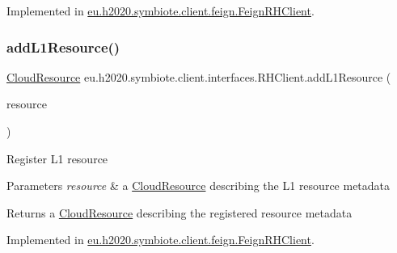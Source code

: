 Implemented in \hyperlink{classeu_1_1h2020_1_1symbiote_1_1client_1_1feign_1_1FeignRHClient_aa15dbd07f234fb7b16db50309af8cd12}{eu.\+h2020.\+symbiote.\+client.\+feign.\+Feign\+R\+H\+Client}.

\mbox{\label{interfaceeu_1_1h2020_1_1symbiote_1_1client_1_1interfaces_1_1RHClient_a7144c5a23f5e77e2fd10c2b79fcacf50}} 
\subsubsection{\texorpdfstring{add\+L1\+Resource()}{addL1Resource()}}
{\footnotesize\ttfamily \hyperlink{classeu_1_1h2020_1_1symbiote_1_1cloud_1_1model_1_1internal_1_1CloudResource}{Cloud\+Resource} eu.\+h2020.\+symbiote.\+client.\+interfaces.\+R\+H\+Client.\+add\+L1\+Resource (\begin{DoxyParamCaption}\item[{\hyperlink{classeu_1_1h2020_1_1symbiote_1_1cloud_1_1model_1_1internal_1_1CloudResource}{Cloud\+Resource}}]{resource }\end{DoxyParamCaption})}

Register L1 resource


\begin{DoxyParams}{Parameters}
{\em resource} & a \hyperlink{}{Cloud\+Resource} describing the L1 resource metadata \\
\hline
\end{DoxyParams}
\begin{DoxyReturn}{Returns}
a \hyperlink{}{Cloud\+Resource} describing the registered resource metadata 
\end{DoxyReturn}


Implemented in \hyperlink{classeu_1_1h2020_1_1symbiote_1_1client_1_1feign_1_1FeignRHClient_a0e90096c4d28520a44ba0ea558027c54}{eu.\+h2020.\+symbiote.\+client.\+feign.\+Feign\+R\+H\+Client}.

\mbox{\label{interfaceeu_1_1h2020_1_1symbiote_1_1client_1_1interfaces_1_1RHClient_a80cce815fd699a09524ed5aa40b9af0e}} 
